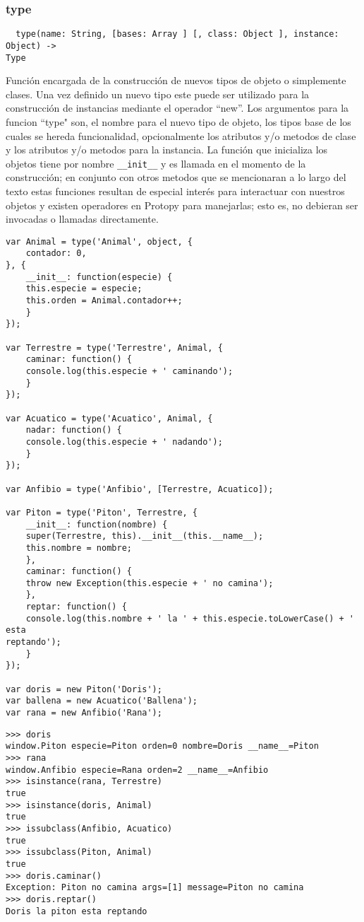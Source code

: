 \subsubsection*{type}
\begin{verbatim}
  type(name: String, [bases: Array ] [, class: Object ], instance: Object) ->
Type
\end{verbatim} 
Función encargada de la construcción de nuevos tipos de objeto o
simplemente clases.
Una vez definido un nuevo tipo este puede ser utilizado para la construcción
de instancias mediante el operador ``new''.
Los argumentos para la funcion ``type" son, el nombre para el nuevo tipo de
objeto, los tipos base de los cuales se hereda funcionalidad, opcionalmente los
atributos y/o metodos de clase y los atributos y/o metodos para la instancia.
La función que inicializa los objetos tiene por nombre \verb|__init__| y es
llamada en el momento de la construcción; en conjunto con otros metodos que se
mencionaran a lo largo del texto estas funciones resultan de especial interés
para interactuar con nuestros objetos y existen operadores en Protopy para
manejarlas; esto es, no debieran ser invocadas o llamadas directamente.
\begin{lstlisting}[style=javascript,label=definicion-de-tipos,caption=Definicion de tipos]
var Animal = type('Animal', object, {
    contador: 0,
}, {
    __init__: function(especie) {
	this.especie = especie;
	this.orden = Animal.contador++;
    }
});

var Terrestre = type('Terrestre', Animal, {
    caminar: function() {
	console.log(this.especie + ' caminando');
    }
});

var Acuatico = type('Acuatico', Animal, {
    nadar: function() {
	console.log(this.especie + ' nadando');
    }
});

var Anfibio = type('Anfibio', [Terrestre, Acuatico]);

var Piton = type('Piton', Terrestre, {
    __init__: function(nombre) {
	super(Terrestre, this).__init__(this.__name__);
	this.nombre = nombre;
    },
    caminar: function() {
	throw new Exception(this.especie + ' no camina');
    },
    reptar: function() {
	console.log(this.nombre + ' la ' + this.especie.toLowerCase() + ' esta
reptando');
    }
});

var doris = new Piton('Doris');
var ballena = new Acuatico('Ballena');
var rana = new Anfibio('Rana');
\end{lstlisting}
\begin{lstlisting}[style=consola]
>>> doris
window.Piton especie=Piton orden=0 nombre=Doris __name__=Piton
>>> rana
window.Anfibio especie=Rana orden=2 __name__=Anfibio
>>> isinstance(rana, Terrestre)
true
>>> isinstance(doris, Animal)
true
>>> issubclass(Anfibio, Acuatico)
true
>>> issubclass(Piton, Animal)
true
>>> doris.caminar()
Exception: Piton no camina args=[1] message=Piton no camina
>>> doris.reptar()
Doris la piton esta reptando
\end{lstlisting}

